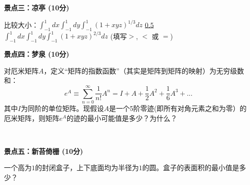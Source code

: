 \documentclass[10pt,CJK]{article}
\begin{document}
{\vskip 0.06in}

{\bf 景点三：凉亭 (10分)}

{\vskip 0.03in}

比较大小：$\int_{-1}^1dx\int_{-1}^1dy\int_{-1}^1 (1+xyz)^{1/3}dz$ \uline{0.5} $\int_{-1}^1dx\int_{-1}^1dy\int_{-1}^1 (1+xyz)^{2/3}dz$ (填写$>$, $<$ 或 $=$)

  {\vskip 0.06in}

{\bf 景点四：梦泉 (10分)}

{\vskip 0.03in}

对厄米矩阵$A$，定义“矩阵的指数函数”（其实是矩阵到矩阵的映射）为无穷级数和：
$$ e^A \equiv \sum_{n=0}^\infty \frac{1}{n!}A^n = I + A + \frac{1}{2}A^2 + \frac{1}{6}A^3+...$$
其中$I$为同阶的单位矩阵。现假设$A$是一个5阶零迹(即所有对角元素之和为零）的厄米矩阵，则矩阵$e^A$的迹的最小可能值是多少？为什么？
  

\newpage


\

{\vskip 2in}

{\bf 景点五：新苔倚栅 (10分)}

一个高为$1$的封闭盒子，上下底面均为半径为$1$的圆。盒子的表面积的最小值是多少？

\ech
\end{document}
